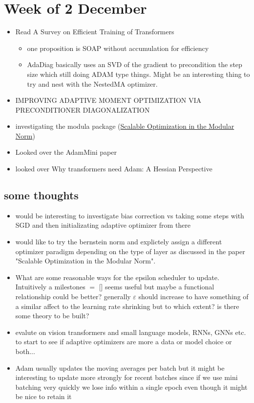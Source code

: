 \documentclass[12pt]{article}
\begin{document}
\section*{Week of 2 December}
\begin{itemize}
\item Read A Survey on Efficient Training of Transformers
	\begin{itemize}
	\item one proposition is SOAP without accumulation for efficiency
	\item AdaDiag basically uses an SVD of the gradient to precondition the step size which still doing ADAM type things. Might be an interesting thing to try and nest with the NestedMA optimizer.
	\end{itemize}
\item IMPROVING ADAPTIVE MOMENT OPTIMIZATION
VIA PRECONDITIONER DIAGONALIZATION
\item investigating the modula package (\href{https://github.com/modula-systems/modula}{Scalable Optimization in the Modular Norm})
\item Looked over the AdamMini paper
\item looked over Why transformers need Adam: A Hessian Perspective
\end{itemize}

\subsection*{some thoughts}
\begin{itemize}
\item would be interesting to investigate bias correction vs taking some steps with SGD and then initializating adaptive optimizer from there
\item would like to try the bernstein norm and explictely assign a different optimizer paradigm depending on the type of layer as discussed in the paper "Scalable Optimization in the Modular Norm". 
\item What are some reasonable ways for the epsilon scheduler to update. Intuitively a milestones $=$ [] seems useful but maybe a functional relationship could be better? 
generally $\varepsilon $ should increase to have something of a similar affect to the learning rate shrinking but to which extent? is there some theory to be built? 
\item evalute on vision transformers and small language models, RNNs, GNNs etc. to start to see if adaptive optimizers are more a data or model choice or both...
\item Adam usually updates the moving averages per batch but it might be interesting to update more strongly for recent batches since if we use mini batching very quickly we lose info within a single epoch even though it might be nice to retain it
\end{itemize}
\end{document}
